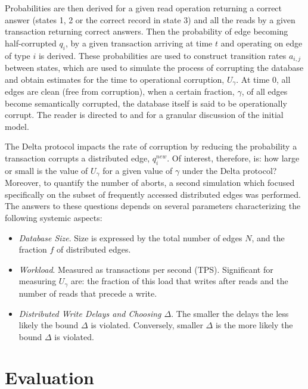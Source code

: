 \documentclass[sigplan,10pt]{acmart}
\newcommand{\tDelta}{\textsf{Delta}\xspace}
\begin{document}
Probabilities are then derived for a given read operation returning a correct answer (states 1, 2 or the correct record in state 3) and all the reads by a given transaction returning correct answers. Then the probability of edge becoming half-corrupted $q_i$, by a given transaction arriving at time $t$ and operating on edge of type $i$ is derived. These probabilities are used to construct transition rates $a_{i,j}$ between states, which are used to simulate the process of corrupting the database and obtain estimates for the time to operational corruption, $U_{\gamma}$. At time $0$, all edges are clean (free from corruption), when a certain fraction, $\gamma$, of all edges become semantically corrupted, the database itself is said to be operationally corrupt. The reader is directed to \cite{Ezhilchelvan2018} and \cite{Webber2019} for a granular discussion of the initial model.


The \tDelta protocol impacts the rate of corruption by reducing the probability a transaction corrupts a distributed edge, $q^{new}_i$. Of interest, therefore, is: how large or small is the value of $U_\gamma$ for a given value of $\gamma$ under the \tDelta protocol? Moreover, to quantify the number of aborts, a second simulation which focused specifically on the subset of frequently accessed distributed edges was performed. The answers to these questions depends on several parameters characterizing the following systemic aspects:
\begin{itemize}
\item \emph{Database Size}. Size is expressed by the total number of edges $N$, and the fraction $f$ of distributed edges.
\item \emph{Workload}. Measured as transactions per second (TPS). Significant for measuring $U_{\gamma}$ are: the fraction of this load that writes after reads and the number of reads that precede a write.
\item \emph{Distributed Write Delays and Choosing $\Delta$}. The smaller the delays the less likely the bound $\Delta$ is violated. Conversely, smaller $\Delta$ is the more likely the bound $\Delta$ is violated.
\end{itemize}

\section{Evaluation}
\label{sec:evaluation}
\end{document}
